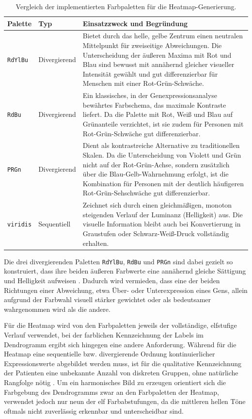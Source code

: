 \documentclass[12pt]{article}
\begin{document}
\begin{table}[H]
	\centering
	\small
	\vspace{0.2cm}
	\begin{tabularx}{\textwidth}{l l X}
		\toprule
		\textbf{Palette} & \textbf{Typ} & \textbf{Einsatzzweck und Begründung} \\
		\midrule
		\texttt{RdYlBu} & Divergierend & Bietet durch das helle, gelbe Zentrum einen neutralen Mittelpunkt für zweiseitige Abweichungen. Die Unterscheidung der äußeren Maxima mit Rot und Blau sind bewusst mit annähernd gleicher visueller Intensität gewählt und gut differenzierbar für Menschen mit einer Rot-Grün-Schwäche. \\
		\addlinespace
		\texttt{RdBu} & Divergierend & Ein klassisches, in der Genexpressionsanalyse bewährtes Farbschema, das maximale Kontraste liefert. Da die Palette mit Rot, Weiß und Blau auf Grünanteile verzichtet, ist sie zudem für Personen mit Rot-Grün-Schwäche gut differenzierbar. \\
		\addlinespace
		\texttt{PRGn} & Divergierend & Dient als kontrastreiche Alternative zu traditionellen Skalen. Da die Unterscheidung von Violett und Grün nicht auf der Rot-Grün-Achse, sondern zusätzlich über die Blau-Gelb-Wahrnehmung erfolgt, ist die Kombination für Personen mit der deutlich häufigeren Rot-Grün-Sehschwäche gut differenzierbar. \\
		\addlinespace
		\texttt{viridis} & Sequentiell & Zeichnet sich durch einen gleichmäßigen, monoton steigenden Verlauf der Luminanz (Helligkeit) aus. Die visuelle Information bleibt auch bei Konvertierung in Graustufen oder Schwarz-Weiß-Druck vollständig erhalten. \\
		\bottomrule
	\end{tabularx}
	\caption{Vergleich der implementierten Farbpaletten für die Heatmap-Generierung.}
	\label{tab:farbpaletten}
\end{table}

Die drei divergierenden Paletten \texttt{RdYlBu}, \texttt{RdBu} und \texttt{PRGn} sind dabei gezielt so konstruiert, dass ihre beiden äußeren Farbwerte eine annähernd gleiche Sättigung und Helligkeit aufweisen \cite{HarrowerBrewer2003}. Dadurch wird vermieden, dass eine der beiden Richtungen einer Abweichung, etwa Über- oder Unterexpression eines Gens, allein aufgrund der Farbwahl visuell stärker gewichtet oder als bedeutsamer wahrgenommen wird als die andere.

Für die Heatmap wird von den Farbpaletten jeweils der vollständige, elfstufige Verlauf verwendet, bei der farblichen Kennzeichnung der Labels im Dendrogramm ergibt sich hingegen eine andere Anforderung. Während für die Heatmap eine sequentielle bzw. divergierende Ordnung kontinuierlicher Expressionswerte abgebildet werden muss, ist für die qualitative Kennzeichnung der Patienten eine unbekannte Anzahl von diskreten Gruppen, ohne natürliche Rangfolge nötig \cite{HarrowerBrewer2003}. Um ein harmonisches Bild zu erzeugen orientiert sich die Farbgebung des Dendrogramms zwar an den Farbpaletten der Heatmap, verwendet jedoch nur neun der elf Farbabstufungen, da die mittleren hellen Töne oftmals nicht zuverlässig erkennbar und unterscheidbar sind. 
\end{document}
